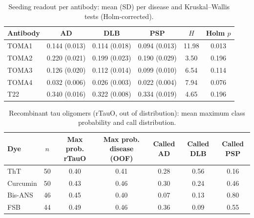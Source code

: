 \begin{table}[!htbp]
\centering\scriptsize
\caption{Seeding readout per antibody: mean (SD) per disease and Kruskal--Wallis tests (Holm-corrected).}\label{tab:s_seeding_ab}
\begin{tabular}{lccccc}
\toprule
\textbf{Antibody} & \textbf{AD} & \textbf{DLB} & \textbf{PSP} & \textbf{$H$} & \textbf{Holm $p$} \\
\midrule
TOMA1 & 0.144 (0.013) & 0.114 (0.018) & 0.094 (0.013) & 11.98 & 0.013 \\
TOMA2 & 0.220 (0.021) & 0.199 (0.023) & 0.190 (0.029) & 3.50 & 0.196 \\
TOMA3 & 0.126 (0.020) & 0.112 (0.014) & 0.099 (0.010) & 6.54 & 0.114 \\
TOMA4 & 0.032 (0.006) & 0.026 (0.003) & 0.022 (0.004) & 7.94 & 0.076 \\
T22 & 0.340 (0.016) & 0.322 (0.008) & 0.334 (0.019) & 4.65 & 0.196 \\
\bottomrule
\end{tabular}
\end{table}

\begin{table}[!htbp]
\centering\scriptsize
\caption{Recombinant tau oligomers (rTauO, out of distribution): mean maximum class probability and call distribution.}\label{tab:s_ood}
\begin{tabular}{lcccccc}
\toprule
\textbf{Dye} & \textbf{$n$} & \textbf{Max prob. rTauO} & \textbf{Max prob. disease (OOF)} & \textbf{Called AD} & \textbf{Called DLB} & \textbf{Called PSP} \\
\midrule
ThT & 50 & 0.40 & 0.41 & 0.28 & 0.56 & 0.16 \\
Curcumin & 50 & 0.43 & 0.46 & 0.30 & 0.24 & 0.46 \\
Bis-ANS & 46 & 0.45 & 0.40 & 0.07 & 0.13 & 0.80 \\
FSB & 44 & 0.49 & 0.46 & 0.36 & 0.09 & 0.55 \\
\bottomrule
\end{tabular}
\end{table}

